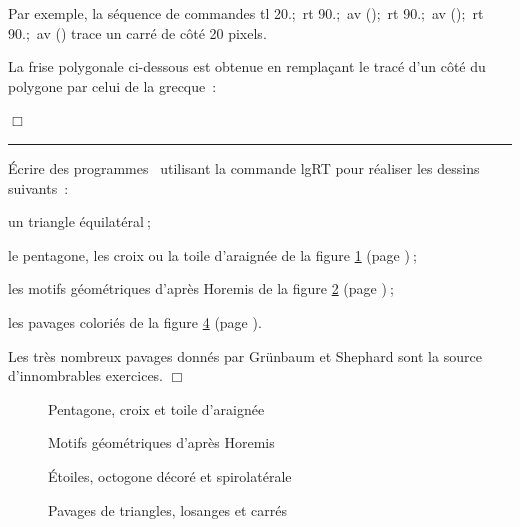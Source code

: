  Par exemple, la séquence de commandes {\idt tl 20.;\ rt 90.;\ av ();\ 
rt 90.;\ av ();\ rt 90.;\ av ()} trace un carré de côté
20 pixels.
\begin{exemple}[Grecque polygonale]{\rm
La frise polygonale ci-dessous est ob\-te\-nue en remplaçant le tracé
d'un côté du polygone par celui de la grecque~:

\vspace{\baselineskip}


\noindent $\Box$ }\end{exemple}
\noindent \rule{137mm}{0.1mm} %
\begin{exercices}{Écrire des programmes \ocaml\  utilisant la commande {\idt lgRT}
pour réaliser les dessins suivants~:

\tiret un triangle équilatéral$\:$;

\tiret le pentagone, les croix ou la toile d'araignée de la figure \ref{fig:PtCrCrTa} (page \pageref{fig:PtCrCrTa})$\:$;

\tiret les motifs géométriques d'après Horemis \cite{horemis} de la figure \ref{fig:horemis} (page \pageref{fig:horemis})$\:$;

\tiret les pavages coloriés de la figure \ref{fig:pavtrilo} (page \pageref{fig:pavtrilo}).

Les très nombreux pavages donnés par Grünbaum et Shephard \cite{grunbaum} sont la source
d'innombrables exercices.
\noindent $\Box$}\end{exercices}
\begin{figure}[htbp]
 \caption{Pentagone, croix et toile d'araignée}\label{fig:PtCrCrTa}
\end{figure}
\begin{figure}[htbp]
 \caption{Motifs géométriques d'après Horemis}\label{fig:horemis}
\end{figure}
\begin{figure}[htbp]
 \caption{Étoiles, octogone décoré et spirolatérale}\label{fig:etocsp}
\end{figure}
\begin{figure}[htbp]
 \caption{Pavages de triangles, losanges et carrés}\label{fig:pavtrilo}
\end{figure}
